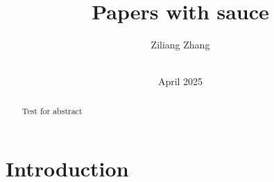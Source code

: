 \documentclass[10pt,conference]{IEEEtran}
\title{Papers with sauce}
\author{%
Ziliang Zhang\\
\affaddr{University of California, Riverside}\\
}
\date{April 2025}
\theoremstyle{definition}
\begin{document}
\maketitle

\thispagestyle{fancy}

\begin{abstract} 
Test for abstract
\end{abstract}

\section{Introduction}





\end{document}

